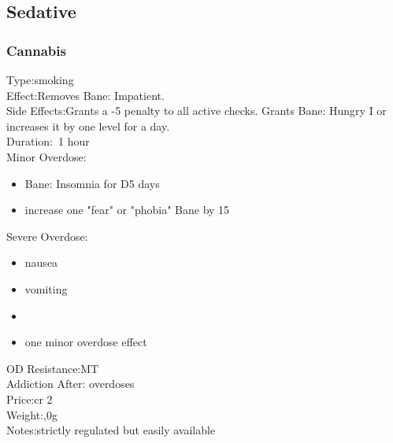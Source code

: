\subsection{Sedative}
\subsubsection{Cannabis}
Type:\tab smoking\\
Effect:\tab Removes Bane: Impatient.\\
Side Effects:\tab Grants a -5 penalty to all active checks.
Grants Bane: Hungry I or increases it by one level for a day.\\
Duration:\tab ~1 hour\\
Minor Overdose:\\
\begin{itemize}
	\setlength\itemsep{-8mm}
	\vspace{-12mm}
	\item Bane: Insomnia for D5 days
	\item increase one "fear" or "phobia" Bane by 15
\end{itemize}
Severe Overdose:\\
\begin{itemize}
	\setlength\itemsep{-8mm}
	\vspace{-12mm}
	\item nausea
	\item vomiting
	\item 
	\item one minor overdose effect
\end{itemize}
OD Resistance:\tab MT\\
Addiction After: overdoses\\
Price:\tab cr 2\\
Weight:,0g\\
Notes:\tab strictly regulated but easily available


